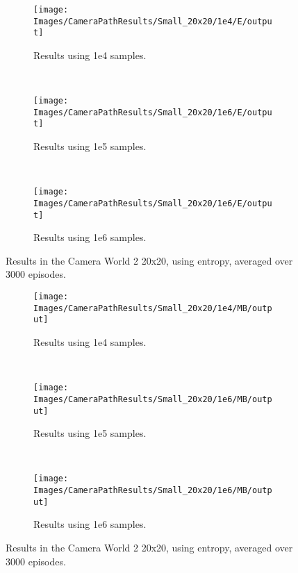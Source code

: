 \begin{figure}[ht!]
        \centering
        \begin{subfigure}[t]{0.3\textwidth}
                \texttt{[image: Images/CameraPathResults/Small\_20x20/1e4/E/output]}
                \caption{Results using 1e4 samples.}
                \label{fig:cps4e}
        \end{subfigure}%
        ~ %
        \begin{subfigure}[t]{0.3\textwidth}
                \texttt{[image: Images/CameraPathResults/Small\_20x20/1e6/E/output]}
                \caption{Results using 1e5 samples.}
                \label{fig:cps5e}
        \end{subfigure}
        ~ %
        \begin{subfigure}[t]{0.3\textwidth}
                \texttt{[image: Images/CameraPathResults/Small\_20x20/1e6/E/output]}
                \caption{Results using 1e6 samples.}
                \label{fig:cps6e}
        \end{subfigure}
        \caption{Results in the Camera World 2 20x20, using entropy, averaged over 3000 episodes.}\label{fig:cpse}
\end{figure}

\begin{figure}[ht]
        \centering
        \begin{subfigure}[t]{0.3\textwidth}
                \texttt{[image: Images/CameraPathResults/Small\_20x20/1e4/MB/output]}
                \caption{Results using 1e4 samples.}
                \label{fig:cps4mb}
        \end{subfigure}%
        ~ %
        \begin{subfigure}[t]{0.3\textwidth}
                \texttt{[image: Images/CameraPathResults/Small\_20x20/1e6/MB/output]}
                \caption{Results using 1e5 samples.}
                \label{fig:cps5mb}
        \end{subfigure}
        ~ %
        \begin{subfigure}[t]{0.3\textwidth}
                \texttt{[image: Images/CameraPathResults/Small\_20x20/1e6/MB/output]}
                \caption{Results using 1e6 samples.}
                \label{fig:cps6mb}
        \end{subfigure}
        \caption{Results in the Camera World 2 20x20, using entropy, averaged over 3000 episodes.}\label{fig:cpsmb}
\end{figure}


